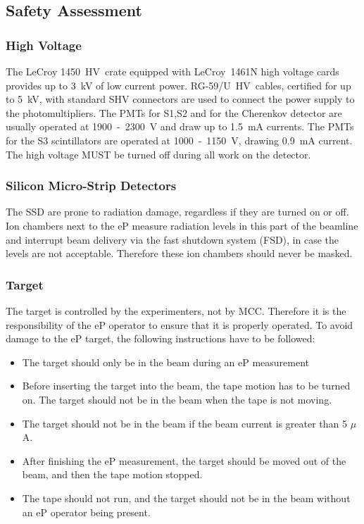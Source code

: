\begin{safetyen}{0}{0}
\subsection {Safety Assessment}
\label{sec:ep_safety}

\subsubsection{High Voltage}

The LeCroy 1450~HV~crate equipped with LeCroy~1461N
high voltage cards provides up to 3~kV of low current power.
RG-59/U~HV~cables, certified for up to 5~kV, with standard SHV 
connectors are used to connect the power supply to the photomultipliers.
The PMTs for S1,S2 and for the Cherenkov detector are usually operated 
at 1900~-~2300~V and draw up to 1.5~mA currents. The PMTs for the 
S3 scintillators are operated at 1000~-~1150~V, drawing 0.9~mA current.
The high voltage MUST be turned off during all work on the detector.

\subsubsection{Silicon Micro-Strip Detectors}

The SSD are prone to radiation damage, regardless if they are 
turned on or off. Ion chambers next to the eP measure radiation levels
in this part of the beamline and interrupt beam delivery via the
fast shutdown system (FSD), in case the levels are not acceptable. Therefore these
ion chambers should never be masked. 

\subsubsection{Target}

The target is controlled by the experimenters, not by MCC. Therefore it is
the responsibility of the eP operator to ensure that it is properly
operated.
To avoid damage to the eP target, the following instructions have to be 
followed:
\begin{itemize}
\item The target should only be in the beam during an eP measurement
\item Before inserting the target into the beam, the tape motion has to
be turned on. The target should not be in the beam when the tape is not moving. 
\item The target should not be in the beam 
if the beam current is greater than 5 $\mu$A. 
\item After finishing the eP measurement, the target should be moved out
of the beam, and then the tape motion stopped. 
\item The tape should not run, and the target should not be in the beam
without an eP operator being present.
\end{itemize}


\end{safetyen}
